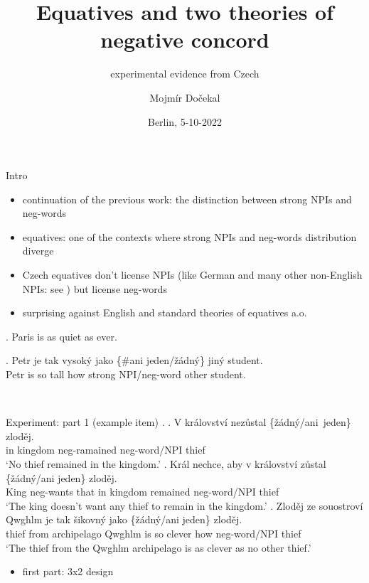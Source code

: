 \documentclass[
  ignorenonframetext,
]{beamer}
\title{Equatives and two theories of negative concord}
\subtitle{experimental evidence from Czech}
\author{Mojmír Dočekal}
\date{Berlin, 5-10-2022}
\institute{FDSL 15}
\providecommand{\tightlist}{%
  \setlength{\itemsep}{0pt}\setlength{\parskip}{0pt}}
\begin{document}
\frame{\titlepage}

\begin{frame}[allowframebreaks]
  \tableofcontents[hideallsubsections]
\end{frame}
\begin{frame}{Intro}
\protect\hypertarget{intro}{}
\begin{itemize}
\tightlist
\item
  continuation of the previous work: the distinction between strong NPIs
  and neg-words
\item
  equatives: one of the contexts where strong NPIs and neg-words
  distribution diverge
\item
  Czech equatives don't license NPIs (like German and many other
  non-English NPIs: see \citealt{krifka1992some}) but license neg-words
\item
  surprising against English and standard theories of equatives
  \cite{stechow1984comparing,beck201913} a.o.
\end{itemize}

\ex. Paris is as quiet as ever.

\exg. Petr je tak vysoký jako \{\#ani jeden/žádný\} jiný student.\\
Petr is so tall how strong NPI/neg-word other student.\\
\hspace*{0.333em}

~
\end{frame}

\begin{frame}
\begin{block}{Experiment: part 1 (example item)}
\protect\hypertarget{experiment-part-1-example-item}{}
\ex. \ag. V království nezůstal \{žádný/ani~jeden\} zloděj.\\
in kingdom neg-ramained neg-word/NPI thief\\
`No thief remained in the kingdom.' \bg. Král nechce, aby v království
zůstal \{žádný/ani jeden\} zloděj.\\
King neg-wants that in kingdom remained neg-word/NPI thief\\
`The king doesn't want any thief to remain in the kingdom.' \cg. Zloděj
ze souostroví Qwghlm je tak šikovný jako \{žádný/ani jeden\} zloděj.\\
thief from archipelago Qwghlm is so clever how neg-word/NPI thief\\
`The thief from the Qwghlm archipelago is as clever as no other thief.'

\begin{itemize}
\tightlist
\item
  first part: 3x2 design
\end{itemize}
\end{block}
\end{frame}
\end{document}
